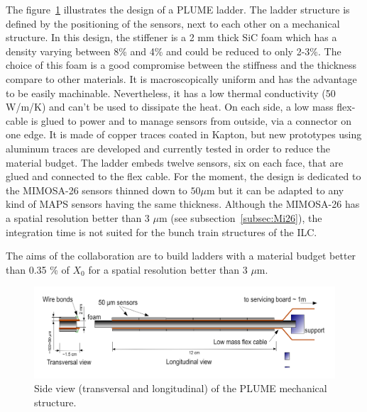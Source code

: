     The figure~\ref{fig:PLUME} illustrates the design of a PLUME ladder.
    The ladder structure is defined by the positioning of the sensors, next to each other on a mechanical structure.
    In this design, the stiffener is a 2 mm thick \gls{SiC} foam which has a density varying between 8\% and 4\% and could be reduced to only 2-3\%.
    The choice of this foam is a good compromise between the stiffness and the thickness compare to other materials. 
    It is macroscopically uniform and has the advantage to be easily machinable.
    Nevertheless, it has a low thermal conductivity (50 W/m/K) and can't be used to dissipate the heat.
    On each side, a low mass flex-cable is glued to power and to manage sensors from outside, via a connector on one edge.
    It is made of copper traces coated in Kapton, but new prototypes using aluminum traces are developed and currently tested in order to reduce the material budget.
    The ladder embeds twelve sensors, six on each face, that are glued and connected to the flex cable.
    For the moment, the design is dedicated to the MIMOSA-26 sensors thinned down to $50 \mu\text{m}$ but it can be adapted to any kind of \gls{MAPS} sensors having the same thickness. 
    Although the MIMOSA-26 has a spatial resolution better than 3 $\mu$m (see subsection~\ref{subsec:Mi26}), the integration time is not suited for the bunch train structures of the \gls{ILC}.

    The aims of the collaboration are to build ladders with a material budget better than 0.35 \% of $X_0$ for a spatial resolution better than 3 $\mu$m.

    \begin{figure}[!h]
      \centering
      \includegraphics[width = 15 cm]{Pictures/vxd/plume_finalGoal.png}
      \caption{Side view (transversal and longitudinal) of the PLUME mechanical structure.}
      \label{fig:PLUME}
    \end{figure}



